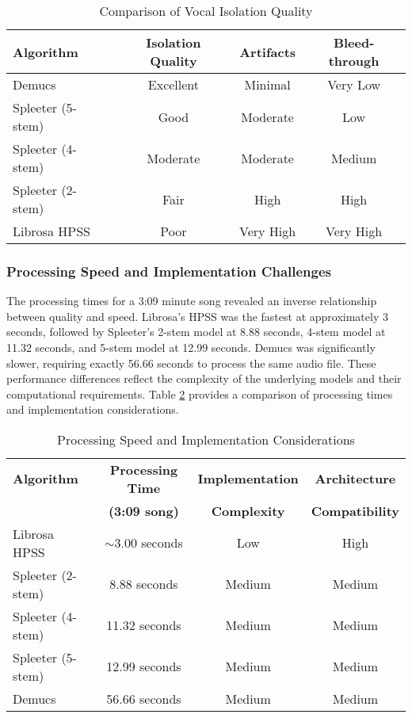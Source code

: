 \documentclass[conference]{IEEEtran}
\begin{document}
\begin{table}[htbp]
\caption{Comparison of Vocal Isolation Quality}
\begin{center}
\begin{tabular}{|l|c|c|c|}
\hline
\textbf{Algorithm} & \textbf{Isolation Quality} & \textbf{Artifacts} & \textbf{Bleed-through} \\
\hline
Demucs & Excellent & Minimal & Very Low \\
\hline
Spleeter (5-stem) & Good & Moderate & Low \\
\hline
Spleeter (4-stem) & Moderate & Moderate & Medium \\
\hline
Spleeter (2-stem) & Fair & High & High \\
\hline
Librosa HPSS & Poor & Very High & Very High \\
\hline
\end{tabular}
\label{tab:vocal_isolation}
\end{center}
\end{table}

\subsubsection{Processing Speed and Implementation Challenges}
The processing times for a 3:09 minute song revealed an inverse relationship between quality and speed. Librosa's HPSS was the fastest at approximately 3 seconds, followed by Spleeter's 2-stem model at 8.88 seconds, 4-stem model at 11.32 seconds, and 5-stem model at 12.99 seconds. Demucs was significantly slower, requiring exactly 56.66 seconds to process the same audio file. These performance differences reflect the complexity of the underlying models and their computational requirements. Table \ref{tab:processing_speed} provides a comparison of processing times and implementation considerations.

\begin{table}[htbp]
\caption{Processing Speed and Implementation Considerations}
\begin{center}
\begin{tabular}{|l|c|c|c|}
\hline
\textbf{Algorithm} & \textbf{Processing Time} & \textbf{Implementation} & \textbf{Architecture} \\
\textbf{} & \textbf{(3:09 song)} & \textbf{Complexity} & \textbf{Compatibility} \\
\hline
Librosa HPSS & $\sim$3.00 seconds & Low & High \\
\hline
Spleeter (2-stem) & 8.88 seconds & Medium & Medium \\
\hline
Spleeter (4-stem) & 11.32 seconds & Medium & Medium \\
\hline
Spleeter (5-stem) & 12.99 seconds & Medium & Medium \\
\hline
Demucs & 56.66 seconds & Medium & Medium \\
\hline
\end{tabular}
\label{tab:processing_speed}
\end{center}
\end{table}
\end{document}
